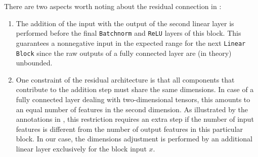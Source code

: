 There are two aspects worth noting about the residual connection in :
\begin{enumerate}
      \item The addition of the input with the output of the second linear layer is performed before the final \texttt{Batchnorm} and \texttt{ReLU} layers of this block.
            This guarantees a nonnegative input in the expected range for the next \texttt{Linear Block} since the raw outputs of a fully connected layer are (in theory) unbounded.

      \item One constraint of the residual architecture is that all components that contribute to the addition step must share the same dimensions.
            In case of a fully connected layer dealing with two-dimensional tensors, this amounts to an equal number of features in the second dimension.
            As illustrated by the annotations in , this restriction requires an extra step if the number of input features is different from the number of output features in this particular block.
            In our case, the dimensions adjustment is performed by an additional linear layer exclusively for the block input $x$.
\end{enumerate}
